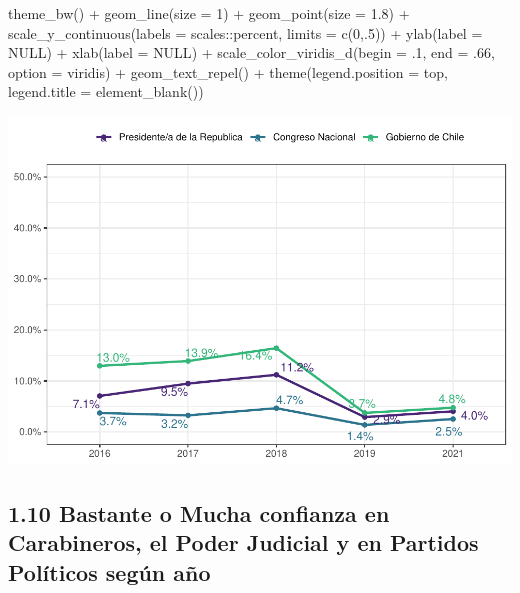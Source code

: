 \documentclass[
  12pt,
]{book}
\newenvironment{Shaded}{\begin{snugshade}}{\end{snugshade}}
\newcommand{\AttributeTok}[1]{\textcolor[rgb]{0.77,0.63,0.00}{#1}}
\newcommand{\ConstantTok}[1]{\textcolor[rgb]{0.00,0.00,0.00}{#1}}
\newcommand{\DecValTok}[1]{\textcolor[rgb]{0.00,0.00,0.81}{#1}}
\newcommand{\FloatTok}[1]{\textcolor[rgb]{0.00,0.00,0.81}{#1}}
\newcommand{\FunctionTok}[1]{\textcolor[rgb]{0.00,0.00,0.00}{#1}}
\newcommand{\NormalTok}[1]{#1}
\newcommand{\SpecialCharTok}[1]{\textcolor[rgb]{0.00,0.00,0.00}{#1}}
\newcommand{\StringTok}[1]{\textcolor[rgb]{0.31,0.60,0.02}{#1}}
\begin{document}
\begin{Shaded}
\begin{Highlighting}[]
    \FunctionTok{theme\_bw}\NormalTok{() }\SpecialCharTok{+}  
    \FunctionTok{geom\_line}\NormalTok{(}\AttributeTok{size =} \DecValTok{1}\NormalTok{) }\SpecialCharTok{+}
    \FunctionTok{geom\_point}\NormalTok{(}\AttributeTok{size =} \FloatTok{1.8}\NormalTok{) }\SpecialCharTok{+}
    \FunctionTok{scale\_y\_continuous}\NormalTok{(}\AttributeTok{labels =}\NormalTok{ scales}\SpecialCharTok{::}\NormalTok{percent,}
                       \AttributeTok{limits =} \FunctionTok{c}\NormalTok{(}\DecValTok{0}\NormalTok{,.}\DecValTok{5}\NormalTok{)) }\SpecialCharTok{+}
    \FunctionTok{ylab}\NormalTok{(}\AttributeTok{label =} \ConstantTok{NULL}\NormalTok{) }\SpecialCharTok{+}
    \FunctionTok{xlab}\NormalTok{(}\AttributeTok{label =} \ConstantTok{NULL}\NormalTok{) }\SpecialCharTok{+}
    \FunctionTok{scale\_color\_viridis\_d}\NormalTok{(}\AttributeTok{begin =}\NormalTok{ .}\DecValTok{1}\NormalTok{, }\AttributeTok{end =}\NormalTok{ .}\DecValTok{66}\NormalTok{, }\AttributeTok{option =} \StringTok{\textquotesingle{}viridis\textquotesingle{}}\NormalTok{) }\SpecialCharTok{+}
    \FunctionTok{geom\_text\_repel}\NormalTok{() }\SpecialCharTok{+}
    \FunctionTok{theme}\NormalTok{(}\AttributeTok{legend.position =} \StringTok{\textquotesingle{}top\textquotesingle{}}\NormalTok{,}
          \AttributeTok{legend.title =} \FunctionTok{element\_blank}\NormalTok{())}
\end{Highlighting}
\end{Shaded}

\includegraphics{reporte-elsoc_files/figure-latex/unnamed-chunk-14-1.pdf}

\hypertarget{bastante-o-mucha-confianza-en-carabineros-el-poder-judicial-y-en-partidos-poluxedticos-seguxfan-auxf1o}{%
\subsection{1.10 Bastante o Mucha confianza en Carabineros, el Poder Judicial y en Partidos Políticos según año}\label{bastante-o-mucha-confianza-en-carabineros-el-poder-judicial-y-en-partidos-poluxedticos-seguxfan-auxf1o}}
\end{document}
